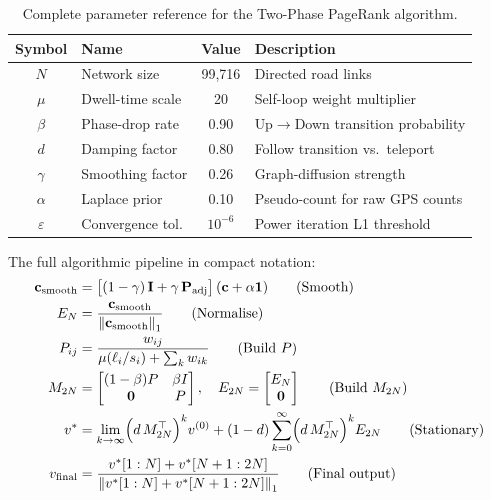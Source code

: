 \documentclass[12pt,a4paper]{article}
\theoremstyle{definition}
\theoremstyle{plain}
\newcommand{\vf}{v_{\mathrm{final}}}
\newcommand{\norm}[1]{\left\|#1\right\|}
\begin{document}
\begin{table}[H]
  \centering
  \caption{Complete parameter reference for the Two-Phase PageRank algorithm.}
  \label{tab:params}
  \begin{tabular}{@{}clcp{5.2cm}@{}}
    \toprule
    Symbol & Name & Value & Description\\
    \midrule
    $N$ & Network size & 99{,}716 & Directed road links\\
    $\mu$ & Dwell-time scale & 20 & Self-loop weight multiplier\\
    $\beta$ & Phase-drop rate & 0.90 & Up$\to$Down transition probability\\
    $d$ & Damping factor & 0.80 & Follow transition vs.\ teleport\\
    $\gamma$ & Smoothing factor & 0.26 & Graph-diffusion strength\\
    $\alpha$ & Laplace prior & 0.10 & Pseudo-count for raw GPS counts\\
    $\varepsilon$ & Convergence tol. & $10^{-6}$ & Power iteration L1 threshold\\
    \bottomrule
  \end{tabular}
\end{table}

The full algorithmic pipeline in compact notation:
\begin{align}
  \mathbf{c}_{\text{smooth}} &= \bigl[(1-\gamma)\,\mathbf{I} + \gamma\,\mathbf{P}_{\text{adj}}\bigr]\,
    (\mathbf{c}+\alpha\mathbf{1}) \tag{Smooth}\\
  E_N &= \frac{\mathbf{c}_{\text{smooth}}}{\norm{\mathbf{c}_{\text{smooth}}}_1}
    \tag{Normalise}\\
  P_{ij} &= \frac{w_{ij}}{\mu(\ell_i/s_i) + \sum_k w_{ik}} \tag{Build $P$}\\
  M_{2N} &= \begin{bmatrix}(1-\beta)P & \beta I\\ \mathbf{0} & P\end{bmatrix},
    \quad E_{2N} = \begin{bmatrix}E_N\\\mathbf{0}\end{bmatrix} \tag{Build $M_{2N}$}\\
  v^* &= \lim_{k\to\infty}
    \Bigl(d\,M_{2N}^\top\Bigr)^k v^{(0)} + (1-d)\sum_{k=0}^{\infty}
    \Bigl(d\,M_{2N}^\top\Bigr)^k E_{2N} \tag{Stationary}\\
  \vf &= \frac{v^*[1:N] + v^*[N+1:2N]}{\norm{v^*[1:N] + v^*[N+1:2N]}_1}
    \tag{Final output}
\end{align}
\end{document}
